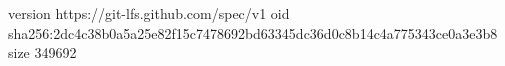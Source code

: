 version https://git-lfs.github.com/spec/v1
oid sha256:2dc4c38b0a5a25e82f15c7478692bd63345dc36d0c8b14c4a775343ce0a3e3b8
size 349692
